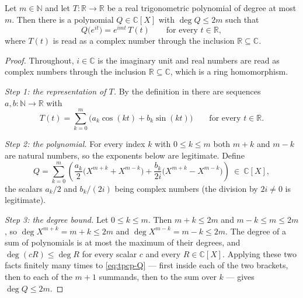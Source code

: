 \begin{lemma}
Let $m\in\mathbb{N}$ and let $T:\mathbb{R}\to\mathbb{R}$ be a real
trigonometric polynomial of degree at most $m$. Then there is a polynomial
$Q\in\mathbb{C}[X]$ with $\deg Q\le 2m$ such that
\[
  Q\bigl(e^{it}\bigr)=e^{imt}\,T(t)\qquad\text{for every }t\in\mathbb{R},
\]
where $T(t)$ is read as a complex number through the inclusion
$\mathbb{R}\subseteq\mathbb{C}$.
\end{lemma}
\begin{proof}
Throughout, $i\in\mathbb{C}$ is the imaginary unit and real numbers are read as
complex numbers through the inclusion $\mathbb{R}\subseteq\mathbb{C}$, which is
a ring homomorphism.

\emph{Step 1: the representation of $T$.} By the definition in
 there are sequences $a,b:\mathbb{N}\to\mathbb{R}$ with
\begin{equation}\label{eq:tpcp-rep}
  T(t)=\sum_{k=0}^{m}\bigl(a_k\cos(kt)+b_k\sin(kt)\bigr)
  \qquad\text{for every }t\in\mathbb{R}.
\end{equation}

\emph{Step 2: the polynomial.} For every index $k$ with $0\le k\le m$ both
$m+k$ and $m-k$ are natural numbers, so the exponents below are legitimate.
Define
\begin{equation}\label{eq:tpcp-Q}
  Q=\sum_{k=0}^{m}\left(
      \frac{a_k}{2}\bigl(X^{m+k}+X^{m-k}\bigr)
      +\frac{b_k}{2i}\bigl(X^{m+k}-X^{m-k}\bigr)
    \right)\ \in\ \mathbb{C}[X],
\end{equation}
the scalars $a_k/2$ and $b_k/(2i)$ being complex numbers (the division by
$2i\ne0$ is legitimate).

\emph{Step 3: the degree bound.} Let $0\le k\le m$. Then $m+k\le 2m$ and
$m-k\le m\le 2m$, so $\deg X^{m+k}=m+k\le2m$ and $\deg X^{m-k}=m-k\le2m$. The
degree of a sum of polynomials is at most the maximum of their degrees, and
$\deg(cR)\le\deg R$ for every scalar $c$ and every $R\in\mathbb{C}[X]$. Applying
these two facts finitely many times to \eqref{eq:tpcp-Q} — first inside each of
the two brackets, then to each of the $m+1$ summands, then to the sum over $k$ —
gives $\deg Q\le 2m$.


\end{proof}
